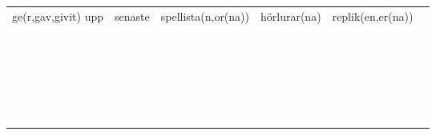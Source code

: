 \begin{center}
\begin{adjustwidth}{-2.4cm}{}
\begin{tabular}{|c c c c c c|}
            ge(r,gav,givit) upp & senaste & spellista(n,or(na)) & hörlurar(na) & replik(en,er(na)) &  \\
             &  &  &  &  &  \\
             &  &  &  &  &  \\
             &  &  &  &  &  \\
             &  &  &  &  &  \\
             &  &  &  &  &  \\
             &  &  &  &  &  \\
             &  &  &  &  &  \\
             &  &  &  &  &  \\
             &  &  &  &  &  \\
             &  &  &  &  &  \\
             &  &  &  &  &  \\
             &  &  &  &  &  \\
             &  &  &  &  &  \\
             &  &  &  &  &  \\
             &  &  &  &  &  \\
             &  &  &  &  &  \\
             &  &  &  &  &  \\
             &  &  &  &  &  \\
             &  &  &  &  &  \\
             &  &  &  &  &  \\
             &  &  &  &  &  \\
             &  &  &  &  &  \\
             &  &  &  &  &  \\
             &  &  &  &  &  \\
            \hline
        \end{tabular}
    \end{adjustwidth}
\end{center}

